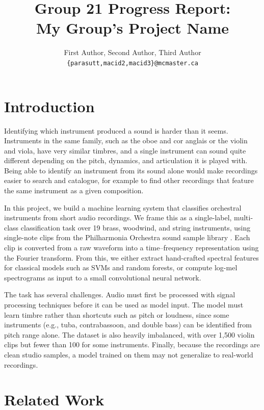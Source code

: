 \documentclass[11pt]{article}
\title{Group 21 Progress Report:\\My Group's Project Name}
\author{First Author, Second Author, Third Author \\
  \texttt{\{parasutt,macid2,macid3\}@mcmaster.ca} }
\begin{document}
\maketitle

\section{Introduction}

Identifying which instrument produced a sound is harder than it seems. Instruments in the same family, such as the oboe and cor anglais or the violin and viola, have very similar timbres, and a single instrument can sound quite different depending on the pitch, dynamics, and articulation it is played with. Being able to identify an instrument from its sound alone would make recordings easier to search and catalogue, for example to find other recordings that feature the same instrument as a given composition.

In this project, we build a machine learning system that classifies orchestral instruments from short audio recordings. We frame this as a single-label, multi-class classification task over 19 brass, woodwind, and string instruments, using single-note clips from the Philharmonia Orchestra sound sample library \citep{philharmonia_samples}. Each clip is converted from a raw waveform into a time--frequency representation using the Fourier transform. From this, we either extract hand-crafted spectral features for classical models such as SVMs and random forests, or compute log-mel spectrograms as input to a small convolutional neural network.

The task has several challenges. Audio must first be processed with signal processing techniques before it can be used as model input. The model must learn timbre rather than shortcuts such as pitch or loudness, since some instruments (e.g., tuba, contrabassoon, and double bass) can be identified from pitch range alone. The dataset is also heavily imbalanced, with over 1,500 violin clips but fewer than 100 for some instruments. Finally, because the recordings are clean studio samples, a model trained on them may not generalize to real-world recordings.

\section{Related Work}
\end{document}
